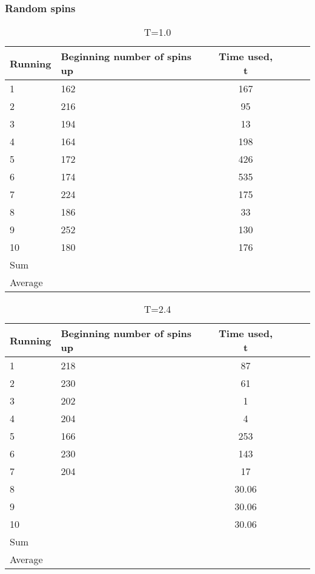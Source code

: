 \documentclass[norsk,a4paper,12pt]{article}
\begin{document}
\subsubsection{Random spins}
\begin{table}[H]
\centering
\caption{T=1.0}
\label{tab:randomT=1} 
\begin{tabularx}{\textwidth}{XlcXrX}
\toprule
Running  & Beginning number of spins up & Time used, t \\
\midrule
1	& 162  & 167    \\
2   & 216  & 95    \\
3   & 194  & 13    \\
4   & 164  & 198    \\
5   & 172  & 426    \\
6 	& 174  & 535    \\
7 	& 224  & 175   \\
8   & 186  & 33   \\
9   & 252  & 130   \\
10  & 180  & 176   \\
\midrule
Sum && \\
Average && \\
\bottomrule
\end{tabularx}
\end{table}
\begin{table}[H]
\centering
\caption{T=2.4}
\label{tab:randomT=2.4} 
\begin{tabularx}{\textwidth}{XlcXrX}
\toprule
Running  & Beginning number of spins up & Time used, t \\
\midrule
1	& 218  & 87    \\
2   & 230  & 61    \\
3   & 202  & 1    \\
4   & 204  & 4    \\
5   & 166  & 253    \\
6 	& 230  & 143    \\
7 	& 204  & 17   \\
8   &   & 30.06   \\
9   &   & 30.06   \\
10   &   & 30.06   \\
\midrule
Sum && \\
Average && \\
\bottomrule
\end{tabularx}
\end{table}
\end{document}
